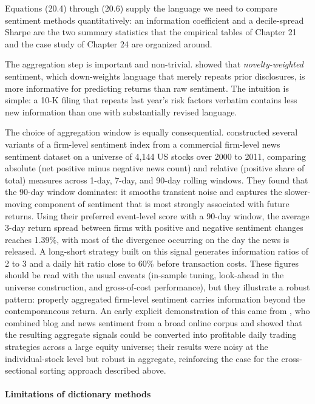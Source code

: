 Equations (20.4) through (20.6) supply the language we need to compare sentiment methods quantitatively: an information coefficient and a decile-spread Sharpe are the two summary statistics that the empirical tables of Chapter 21 and the case study of Chapter 24 are organized around.

The aggregation step is important and non-trivial. \cite{calomiris2019news} showed that \textit{novelty-weighted} sentiment, which down-weights language that merely repeats prior disclosures, is more informative for predicting returns than raw sentiment. The intuition is simple: a 10-K filing that repeats last year's risk factors verbatim contains less new information than one with substantially revised language.

The choice of aggregation window is equally consequential. \cite{hafez2012short} constructed several variants of a firm-level sentiment index from a commercial firm-level news sentiment dataset on a universe of 4,144 US stocks over 2000 to 2011, comparing absolute (net positive minus negative news count) and relative (positive share of total) measures across 1-day, 7-day, and 90-day rolling windows. They found that the 90-day window dominates: it smooths transient noise and captures the slower-moving component of sentiment that is most strongly associated with future returns. Using their preferred event-level score with a 90-day window, the average 3-day return spread between firms with positive and negative sentiment changes reaches 1.39\%, with most of the divergence occurring on the day the news is released. A long-short strategy built on this signal generates information ratios of 2 to 3 and a daily hit ratio close to 60\% before transaction costs. These figures should be read with the usual caveats (in-sample tuning, look-ahead in the universe construction, and gross-of-cost performance), but they illustrate a robust pattern: properly aggregated firm-level sentiment carries information beyond the contemporaneous return. An early explicit demonstration of this came from \cite{zhang2010trading}, who combined blog and news sentiment from a broad online corpus and showed that the resulting aggregate signals could be converted into profitable daily trading strategies across a large equity universe; their results were noisy at the individual-stock level but robust in aggregate, reinforcing the case for the cross-sectional sorting approach described above.

\paragraph{Limitations of dictionary methods}

